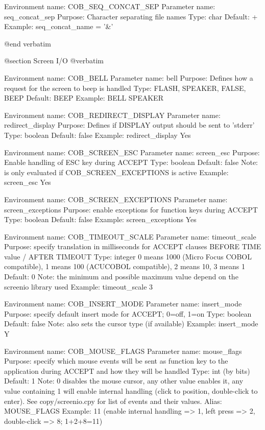 Environment name:  COB_SEQ_CONCAT_SEP
  Parameter name:  seq_concat_sep
         Purpose:  Character separating file names
            Type:  char
         Default:  +
         Example:  seq_concat_name = '&'


@end verbatim

@section Screen I/O
@verbatim


Environment name:  COB_BELL
  Parameter name:  bell
         Purpose:  Defines how a request for the screen to beep is handled
            Type:  FLASH, SPEAKER, FALSE, BEEP
         Default:  BEEP
         Example:  BELL SPEAKER

Environment name:  COB_REDIRECT_DISPLAY
  Parameter name:  redirect_display
         Purpose:  Defines if DISPLAY output should be sent to 'stderr'
            Type:  boolean
         Default:  false
         Example:  redirect_display Yes

Environment name:  COB_SCREEN_ESC
  Parameter name:  screen_esc
         Purpose:  Enable handling of ESC key during ACCEPT
            Type:  boolean
         Default:  false
            Note:  is only evaluated if COB_SCREEN_EXCEPTIONS is active
         Example:  screen_esc Yes

Environment name:  COB_SCREEN_EXCEPTIONS
  Parameter name:  screen_exceptions
         Purpose:  enable exceptions for function keys during ACCEPT
            Type:  boolean
         Default:  false
         Example:  screen_exceptions Yes

Environment name:  COB_TIMEOUT_SCALE
  Parameter name:  timeout_scale
         Purpose:  specify translation in milliseconds for ACCEPT clauses
                   BEFORE TIME value / AFTER TIMEOUT
            Type:  integer
                   0 means 1000 (Micro Focus COBOL compatible), 1 means 100
                   (ACUCOBOL compatible), 2 means 10, 3 means 1
         Default:  0
            Note:  the minimum and possible maximum value depend on the
                   screenio library used
         Example:  timeout_scale 3

Environment name:  COB_INSERT_MODE
  Parameter name:  insert_mode
         Purpose:  specify default insert mode for ACCEPT; 0=off, 1=on
            Type:  boolean
         Default:  false
            Note:  also sets the cursor type (if available)
         Example:  insert_mode Y

Environment name:  COB_MOUSE_FLAGS
  Parameter name:  mouse_flags
         Purpose:  specify which mouse events will be sent as function key
                   to the application during ACCEPT and how they will be
                   handled
            Type:  int (by bits)
         Default:  1
            Note:  0 disables the mouse cursor, any other value enables it,
                   any value containing 1 will enable internal handling (click
                   to position, double-click to enter).
                   See copy/screenio.cpy for list of events and their values.
           Alias:  MOUSE_FLAGS
         Example:  11 (enable internal handling => 1, left press => 2,
                       double-click => 8; 1+2+8=11)

